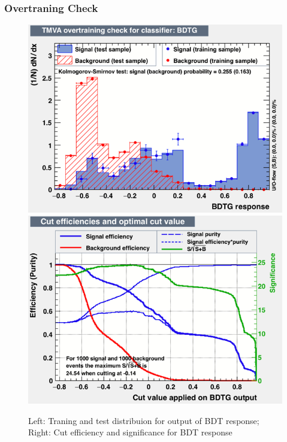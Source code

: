 \subsubsection{Overtraning Check}
\begin{figure}[h!]
	\includegraphics[scale=0.40]{Plots/BDT_Performance/Trial1/dataset/plots/overtrain_BDTG.png}%
	\includegraphics[scale=0.40]{Plots/BDT_Performance/Trial1/dataset/plots/mvaeffs_BDTG.png}
	\caption{Left: Traning and test distribuion for output of BDT response; Right: Cut efficiency and significance for BDT response}
\end{figure}


